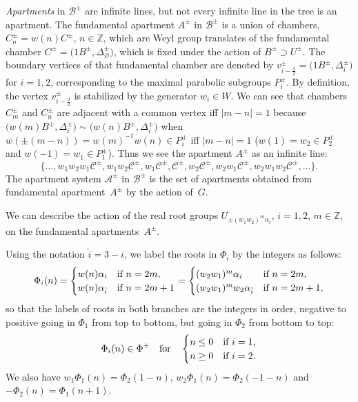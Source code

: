\documentclass[pdftex]{sigma}
\numberwithin{equation}{section}
\def\Z{\mathbb{Z}}
\def\a{\alpha}
\def\roots{{\Phi}}
\def\cA{\mathcal A}
\def\cB{\mathcal B}
\def\cC{\mathcal C}
\begin{document}
{\it Apartments} in $\cB^\pm$ are infinite lines, but not every infinite line in the tree is an apartment.
The fundamental apartment $A^\pm$ in $\cB^\pm$ is a union of chambers, $C^\pm_n = w(n)C^\pm$, $n\in\Z$, which are Weyl group translates of the fundamental chamber $C^\pm = \big(1B^\pm, \Delta_{\varnothing}^\pm\big)$, which is fixed under the action of $B^\pm\supset U^\pm$. The boundary vertices of that fundamental chamber are denoted
by $v_{i-\frac{3}{2}}^\pm= \big(1B^\pm, \Delta_{i}^\pm\big)$ for $i = 1,2$, corresponding to the maximal parabolic subgroups $P_i^\pm$. By definition, the vertex $v_{i-\frac{3}{2}}^\pm$ is stabilized by the generator $w_i\in W$.
We can see that chambers $C^\pm_m$ and $C^\pm_n$
are adjacent with a common vertex iff $|m-n|=1$ because $\big(w(m)B^\pm, \Delta_{i}^\pm\big)\sim \big(w(n)B^\pm, \Delta_{i}^\pm\big)$ when
$w(\pm(m-n)) = w(m)^{-1} w(n)\in P^\pm_i$ iff $|m-n|=1$ ($w(1) = w_2\in P^\pm_2$ and $w(-1) = w_1\in P^\pm_1$). Thus we see the
apartment $A^\pm$ as an infinite line:
\[\big\{\dots, w_1w_2w_1\cC^\pm, w_1w_2\cC^\pm, w_1\cC^\pm, \cC^\pm, w_2\cC^\pm, w_2w_1\cC^\pm,
 w_2w_1w_2\cC^\pm, \dots\big\}.\]
The apartment system $\cA^\pm$ in $\cB^\pm$ is the set of apartments obtained from fundamental apartment~$A^\pm$ by the action of~$G$.

We can describe the action of the real root groups $U_{\pm(w_1 w_2)^m\a_i}$, $i=1,2$, $m\in\Z$, on the fundamental apartments~$A^\pm$.

Using the notation ${\hat i} = 3-i$, we label the roots in $\roots_i$ by the integers as follows:
\[\roots_i(n) = \begin{cases} w(n) \a_i & \hbox{if }n = 2m, \\ w(n) \a_{\hat i} & \hbox{if }n = 2m+1\end{cases}
= \begin{cases} (w_2 w_1)^m \a_i& \hbox{if }n = 2m, \\ (w_2 w_1)^m w_2 \a_{\hat i}& \hbox{if }n = 2m+1,\end{cases}\]
so that the labels of roots in both branches are the integers in order, negative to positive going in $\roots_1$ from
top to bottom, but going in $\roots_2$ from bottom to top:
\[\roots_i(n) \in \roots^+ \quad \text{for} \quad \begin{cases} n\leq 0 & \hbox{if }i = 1, \\ n\geq 0 & \hbox{if }i=2. \end{cases}\]
We also have $w_1\roots_1(n) = \roots_2(1-n)$, $w_2\roots_1(n) = \roots_2(-1-n)$ and $-\roots_2(n) = \roots_1(n+1)$.
\end{document}
